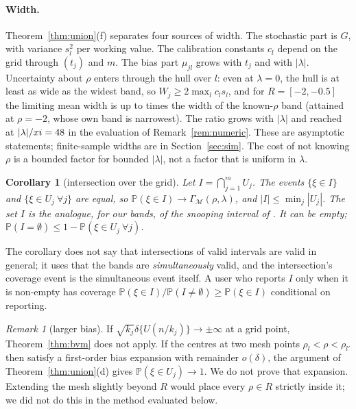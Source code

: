 \documentclass[11pt]{article}
\newtheorem{corollary}{Corollary}
\theoremstyle{definition}
\theoremstyle{remark}
\newtheorem{remark}{Remark}
\numberwithin{equation}{section}
\newcommand{\Prob}{\mathbb{P}}
\newcommand{\Mesh}{\mathcal{M}}
\begin{document}
\paragraph{Width.} Theorem~\ref{thm:union}(f) separates four sources of width. The stochastic part is $G$, with variance $s_l^2$ per working value. The calibration constants $c_l$ depend on the grid through $(t_j)$ and $m$. The bias part $\mu_{jl}$ grows with $t_j$ and with $|\lambda|$. Uncertainty about $\rho$ enters through the hull over $l$: even at $\lambda=0$, the hull is at least as wide as the widest band, so $W_j\ge2\max_lc_ls_l$, and for $R=[-2,-0.5]$ the limiting mean width is up to \widthRatioZero{} times the width of the known-$\rho$ band (attained at $\rho=-2$, whose own band is narrowest). The ratio grows with $|\lambda|$ and reached \widthRatioMax{} at $|\lambda|/xi=48$ in the evaluation of Remark~\ref{rem:numeric}. These are asymptotic statements; finite-sample widths are in Section~\ref{sec:sim}. The cost of not knowing $\rho$ is a bounded factor for bounded $|\lambda|$, not a factor that is uniform in $\lambda$.

\begin{corollary}[intersection over the grid]\label{cor:intersection}
Let $I=\bigcap_{j=1}^mU_j$. The events $\{\xi\in I\}$ and $\{\xi\in U_j\ \forall j\}$ are equal, so $\Prob(\xi\in I)\to\Gamma_\Mesh(\rho,\lambda)$, and $|I|\le\min_j|U_j|$. The set $I$ is the analogue, for our bands, of the snooping interval of \citet[eq.~15]{sasakiwang2024}. It can be empty; $\Prob(I=\emptyset)\le1-\Prob(\xi\in U_j\ \forall j)$.
\end{corollary}

The corollary does not say that intersections of valid intervals are valid in general; it uses that the bands are \emph{simultaneously} valid, and the intersection's coverage event is the simultaneous event itself. A user who reports $I$ only when it is non-empty has coverage $\Prob(\xi\in I)/\Prob(I\neq\emptyset)\ge\Prob(\xi\in I)$ conditional on reporting.

\begin{remark}[larger bias]\label{rem:R2}
If $\sqrt{k_j}\delta\{U(n/k_j)\}\to\pm\infty$ at a grid point, Theorem~\ref{thm:bvm} does not apply. If the centres at two mesh points $\rho_l<\rho<\rho_{l'}$ then satisfy a first-order bias expansion with remainder $o(\delta)$, the argument of Theorem~\ref{thm:union}(d) gives $\Prob(\xi\in U_j)\to1$. We do not prove that expansion. Extending the mesh slightly beyond $R$ would place every $\rho\in R$ strictly inside it; we did not do this in the method evaluated below.
\end{remark}
\end{document}
